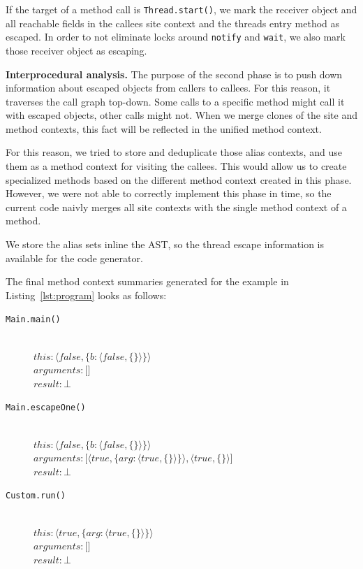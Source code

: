 \documentclass[letterpaper]{article}
\newcommand{\mypar}[1]{{\bf #1.}}
\begin{document}
If the target of a method call is \texttt{Thread.start()}, we mark the receiver object and all reachable fields
in the callees site context and the threads entry method as escaped.
In order to not eliminate locks around \texttt{notify} and \texttt{wait}, we also mark those receiver
object as escaping. 

\mypar{Interprocedural analysis}
The purpose of the second phase is to push down information about escaped objects from callers to callees.
For this reason, it traverses the call graph top-down. Some calls to a specific method might call it
with escaped objects, other calls might not. When we merge clones of the site and method contexts,
this fact will be reflected in the unified method context. 

For this reason, we tried to store and deduplicate those alias contexts, and use them as a method context
for visiting the callees. This would allow us to create specialized methods based on the different
method context created in this phase. However, we were not able to correctly implement this phase in time,
so the current code naivly merges all site contexts with the single method context of a method.

We store the alias sets inline the AST, so the thread escape information is available for the code
generator.

The final method context summaries generated for the example in Listing~\ref{lst:program} looks as follows:

{ \footnotesize

\begin{description}
\item[\texttt{Main.main()}] \hfill \\
    $ this: \langle false, \{ b:\langle false, \{ \} \rangle\} \rangle $ \\ 
    $ arguments: \lbrack \rbrack $ \\
    $ result: \bot  $ 
\item[\texttt{Main.escapeOne()}] \hfill \\
    $ this: \langle false, \{ b:\langle false, \{ \} \rangle\} \rangle $ \\
    $ arguments: \lbrack \langle true, \{ arg:\langle true, \{ \} \rangle\} \rangle, \langle true, \{ \} \rangle \rbrack $ \\
    $ result: \bot $
\item[\texttt{Custom.run()}] \hfill \\
 $ this: \langle true, \{ arg:\langle true, \{ \} \rangle\} \rangle $ \\
 $ arguments: \lbrack \rbrack $ \\ 
 $ result: \bot $
\end{description}
}
\end{document}
